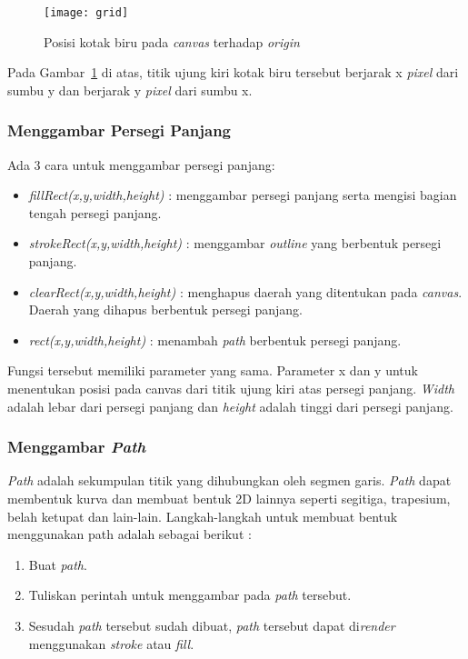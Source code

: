 \begin{figure}[H]
	\centering  
	\texttt{[image: grid]}
	\caption[Posisi kotak biru pada \textit{canvas} terhadap \textit{origin}]{Posisi kotak biru pada \textit{canvas} terhadap \textit{origin}\cite{MDN:05:Web}}
	\label{fig:grid} 
\end{figure} 

Pada Gambar~\ref{fig:grid} di atas, titik ujung kiri kotak biru tersebut berjarak x \textit{pixel} dari sumbu y dan berjarak y \textit{pixel} dari sumbu x. 

\subsubsection{Menggambar Persegi Panjang}
Ada 3 cara untuk menggambar persegi panjang:

\begin{itemize}
	\item \textit{fillRect(x,y,width,height)} : menggambar persegi panjang serta mengisi bagian tengah persegi panjang.
	\item \textit{strokeRect(x,y,width,height)} : menggambar \textit{outline} yang berbentuk persegi panjang.
	\item \textit{clearRect(x,y,width,height)} : menghapus daerah yang ditentukan pada \textit{canvas}. Daerah yang dihapus berbentuk persegi panjang.
	\item \textit{rect(x,y,width,height)} : menambah \textit{path} berbentuk persegi panjang.
\end{itemize}

Fungsi tersebut memiliki parameter yang sama. Parameter x dan y untuk menentukan posisi pada canvas dari titik ujung kiri atas persegi panjang. \textit{Width} adalah lebar dari persegi panjang dan \textit{height} adalah tinggi dari persegi panjang.

\subsubsection{Menggambar \textit{Path}}
\textit{Path} adalah sekumpulan titik yang dihubungkan oleh segmen garis. \textit{Path} dapat membentuk kurva dan membuat bentuk 2D lainnya seperti segitiga, trapesium, belah ketupat dan lain-lain. Langkah-langkah untuk membuat bentuk menggunakan path adalah sebagai berikut : 

\begin{enumerate}
	\item Buat \textit{path}.
	\item Tuliskan perintah untuk menggambar pada \textit{path} tersebut.
	\item Sesudah \textit{path} tersebut sudah dibuat, \textit{path} tersebut dapat di\textit{render} menggunakan \textit{stroke} atau \textit{fill}.
\end{enumerate}

